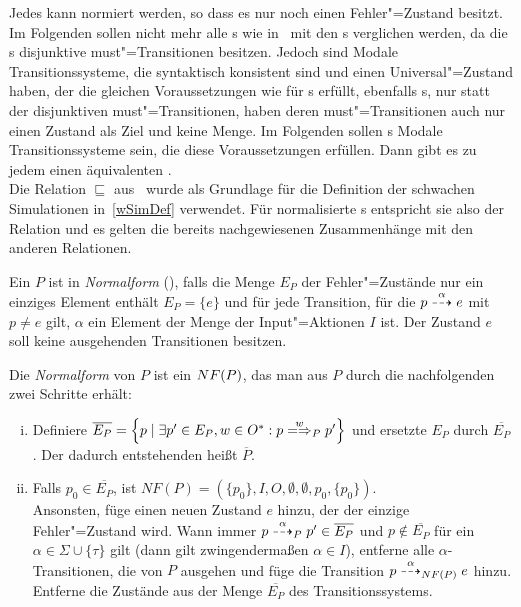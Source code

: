 Jedes \MEIO{} kann normiert werden, so dass es nur noch einen Fehler"=Zustand
besitzt. Im Folgenden sollen nicht mehr alle \MIA{}s wie
in~\cite{Vogler2016MIA3} mit den \MEIO{}s verglichen werden, da die \MIA{}s
disjunktive must"=Transitionen besitzen. Jedoch sind Modale Transitionssysteme,
die syntaktisch konsistent sind und einen Universal"=Zustand haben, der die
gleichen Voraussetzungen wie für \MIA{}s erfüllt, ebenfalls \MIA{}s, nur statt
der disjunktiven must"=Transitionen, haben deren must"=Transitionen auch nur
einen Zustand als Ziel und keine Menge. Im Folgenden sollen \MIA{}s Modale
Transitionssysteme sein, die diese Voraussetzungen erfüllen. Dann gibt es zu
jedem \MEIO{} einen äquivalenten \MIA{}.\\
Die Relation $\sqsubseteq$ aus~\cite{Vogler2016MIA3} wurde als Grundlage für
die Definition der schwachen Simulationen in~\ref{wSimDef} verwendet. Für
normalisierte \MEIO{}s entspricht sie also der Relation \wasRel{} und es gelten
die bereits nachgewiesenen Zusammenhänge mit den anderen Relationen.

\begin{Def}[Normalform]
  \label{NFDef}
  Ein \MEIO{} $P$ ist in \emph{Normalform} (\NF{}), falls die Menge $E_P$ der
  Fehler"=Zustände nur ein einziges Element enthält $E_P=\{e\}$ und für jede
  Transition, für die $p \may[\alpha] e$ mit $p\neq e$ gilt, $\alpha$ ein
  Element der Menge der Input"=Aktionen $I$ ist. Der Zustand $e$ soll keine
  ausgehenden Transitionen besitzen.

  Die \emph{Normalform} von $P$ ist ein \MEIO{} $NF (P)$, das man aus $P$
  durch die nachfolgenden zwei Schritte erhält:
  \begin{enumerate}[(i)]
    \item Definiere $\overline{E_P} = \left\{p \mid \exists p'\in E_P, w\in
      O^*: p\weakmay[w]_P p'\right\}$ und ersetzte $E_P$ durch
      $\overline{E_P}$. Der dadurch entstehenden \MEIO{} heißt $\overline{P}$.
    \item Falls $p_0\in \overline{E_P}$, ist $NF(P) = \left(\{p_0\}, I, O,
      \emptyset , \emptyset , p_0, \{p_0\}\right)$.\\
      Ansonsten, füge einen neuen Zustand $e$ hinzu, der der einzige
      Fehler"=Zustand wird. Wann immer $p \may[\alpha]_P p'\in \overline{E_P}$
      und $p\notin \overline{E_P}$ für ein $\alpha\in \Sigma \cup \{\tau\}$
      gilt (dann gilt zwingendermaßen $\alpha \in I$), entferne alle
      $\alpha$-Transitionen, die von $P$ ausgehen und füge die Transition
      $p\may[\alpha]_{\NF (P)} e$ hinzu. Entferne die Zustände aus der Menge
      $\overline{E_P}$ des Transitionssystems.
  \end{enumerate}
\end{Def}

